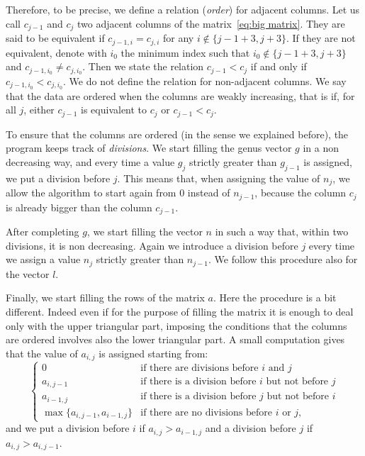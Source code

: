 \documentclass{amsart}
\theoremstyle{plain}
\theoremstyle{definition}
\begin{document}
Therefore, to be precise, we define a relation (\emph{order}) for
adjacent columns. Let us call $c_{j-1}$ and $c_j$ two adjacent columns
of the matrix~\eqref{eq:big matrix}. They are said to be equivalent if
$c_{j-1,i} = c_{j,i}$ for any $i \notin \{j-1+3, j+3\}$. If they are
not equivalent, denote with $i_0$ the minimum index such that $i_0
\notin \{ j-1+3, j+3\}$ and $c_{j-1,i_0} \neq c_{j,i_0}$. Then we
state the relation $c_{j-1} < c_j$ if and only if $c_{j-1,i_0} <
c_{j,i_0}$. We do not define the relation for non-adjacent columns.
We say that the data are ordered when the columns are weakly
increasing, that is if, for all $j$, either $c_{j-1}$ is equivalent to
$c_j$ or $c_{j-1} < c_j$.

To ensure that the columns are ordered (in the sense we explained
before), the program keeps track of \emph{divisions}. We start filling
the genus vector $g$ in a non decreasing way, and every time a value
$g_j$ strictly greater than $g_{j-1}$ is assigned, we put a division
before $j$.
This means that, when assigning the value of $n_j$, we allow
the algorithm to start again from $0$ instead of $n_{j-1}$, because the column
$c_j$ is already bigger than the column $c_{j-1}$.

After completing $g$, we start filling the vector $n$ in such a way
that, within two divisions, it is non decreasing. Again we introduce a
division before $j$ every time we assign a value $n_j$ strictly
greater than $n_{j-1}$. We follow this procedure also for the vector
$l$.

Finally, we start filling the rows of the matrix $a$. Here the
procedure is a bit different. Indeed even if for the purpose of
filling the matrix it is enough to deal only with the upper triangular
part, imposing the conditions that the columns are ordered involves
also the lower triangular part. A small computation gives that the
value of $a_{i,j}$ is assigned starting from:
\[
\begin{cases}
  0 & \text{if there are divisions before $i$ and $j$}\\
  a_{i,j-1} & \text{if there is a division before $i$ but not before
    $j$}\\
  a_{i-1,j} & \text{if there is a division before $j$ but not before
    $i$}\\
  \max\{a_{i,j-1}, a_{i-1,j}\} & \text{if there are no divisions
    before $i$ or $j$,}
\end{cases}
\]
and we put a division before $i$ if $a_{i,j} > a_{i-1,j}$ and a
division before $j$ if $a_{i,j} > a_{i,j-1}$.
\end{document}
